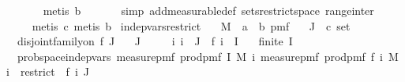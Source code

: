 \begin{isabellebody}
\ \ \ \ \ \ \isamarkupfalse%
\ {\isacharparenleft}{\kern0pt}metis\ b{\isacharparenright}{\kern0pt}\isanewline
\ \ \ \ \ \isamarkupfalse%
\ {\isacharparenleft}{\kern0pt}simp\ add{\isacharcolon}{\kern0pt}measurable{\isacharunderscore}{\kern0pt}def\ sets{\isacharunderscore}{\kern0pt}restrict{\isacharunderscore}{\kern0pt}space\ range{\isacharunderscore}{\kern0pt}inter{\isacharparenright}{\kern0pt}\isanewline
\ \ \ \ \isamarkupfalse%
\ {\isacharparenleft}{\kern0pt}metis\ c{\isacharcomma}{\kern0pt}\ metis\ b{\isacharparenright}{\kern0pt}\isanewline
{}\isamarkupfalse%
%
\endisatagproof
{\isafoldproof}%
%
\isadelimproof
\isanewline
%
\endisadelimproof
\isanewline
{}\isamarkupfalse%
\ indep{\isacharunderscore}{\kern0pt}vars{\isacharunderscore}{\kern0pt}restrict{\isacharcolon}{\kern0pt}\isanewline
\ \ \ M\ {\isacharcolon}{\kern0pt}{\isacharcolon}{\kern0pt}\ {\isachardoublequoteopen}{\isacharprime}{\kern0pt}a\ {\isasymRightarrow}\ {\isacharprime}{\kern0pt}b\ pmf{\isachardoublequoteclose}\isanewline
\ \ \ J\ {\isacharcolon}{\kern0pt}{\isacharcolon}{\kern0pt}\ {\isachardoublequoteopen}{\isacharprime}{\kern0pt}c\ set{\isachardoublequoteclose}\isanewline
\ \ \ {\isachardoublequoteopen}disjoint{\isacharunderscore}{\kern0pt}family{\isacharunderscore}{\kern0pt}on\ f\ J{\isachardoublequoteclose}\isanewline
\ \ \ {\isachardoublequoteopen}J\ {\isasymnoteq}\ {\isacharbraceleft}{\kern0pt}{\isacharbraceright}{\kern0pt}{\isachardoublequoteclose}\isanewline
\ \ \ {\isachardoublequoteopen}{\isasymAnd}i{\isachardot}{\kern0pt}\ i\ {\isasymin}\ J\ {\isasymLongrightarrow}\ f\ i\ {\isasymsubseteq}\ I{\isachardoublequoteclose}\isanewline
\ \ \ {\isachardoublequoteopen}finite\ I{\isachardoublequoteclose}\isanewline
\ \ \ {\isachardoublequoteopen}prob{\isacharunderscore}{\kern0pt}space{\isachardot}{\kern0pt}indep{\isacharunderscore}{\kern0pt}vars\ {\isacharparenleft}{\kern0pt}measure{\isacharunderscore}{\kern0pt}pmf\ {\isacharparenleft}{\kern0pt}prod{\isacharunderscore}{\kern0pt}pmf\ I\ M{\isacharparenright}{\kern0pt}{\isacharparenright}{\kern0pt}\ {\isacharparenleft}{\kern0pt}{\isasymlambda}i{\isachardot}{\kern0pt}\ measure{\isacharunderscore}{\kern0pt}pmf\ {\isacharparenleft}{\kern0pt}prod{\isacharunderscore}{\kern0pt}pmf\ {\isacharparenleft}{\kern0pt}f\ i{\isacharparenright}{\kern0pt}\ M{\isacharparenright}{\kern0pt}{\isacharparenright}{\kern0pt}\ {\isacharparenleft}{\kern0pt}{\isasymlambda}i\ {\isasymomega}{\isachardot}{\kern0pt}\ restrict\ {\isasymomega}\ {\isacharparenleft}{\kern0pt}f\ i{\isacharparenright}{\kern0pt}{\isacharparenright}{\kern0pt}\ J{\isachardoublequoteclose}\isanewline

\end{isabellebody}
